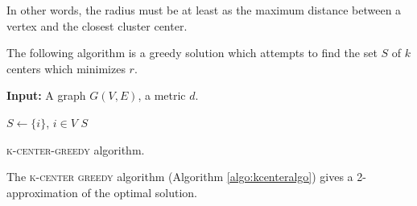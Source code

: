 In other words, the radius must be at least as the maximum distance between a vertex and the closest cluster center.

The following algorithm is a greedy solution which attempts to find the set $S$ of $k$ centers which minimizes $r$.

\begin{algorithm}
	\textbf{Input:} A graph $G(V, E)$, a metric $d$.
	
	$S \gets \{ i \}$, $i \in V$\;
\Return $S$
\caption{\textsc{k-center-greedy} algorithm.}
\label{algo:kcenteralgo}
\end{algorithm}
\begin{thm}

	The \textsc{k-center greedy} algorithm (Algorithm \ref{algo:kcenteralgo}) gives a 2-approximation of the optimal solution.
	
\end{thm}
